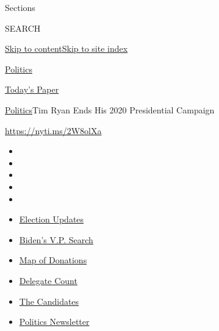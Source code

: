 Sections

SEARCH

\protect\hyperlink{site-content}{Skip to
content}\protect\hyperlink{site-index}{Skip to site index}

\href{https://www.nytimes.com/section/politics}{Politics}

\href{https://myaccount.nytimes.com/auth/login?response_type=cookie\&client_id=vi}{}

\href{https://www.nytimes.com/section/todayspaper}{Today's Paper}

\href{/section/politics}{Politics}\textbar{}Tim Ryan Ends His 2020
Presidential Campaign

\url{https://nyti.ms/2W8olXa}

\begin{itemize}
\item
\item
\item
\item
\item
\end{itemize}

\begin{itemize}
\item
  \href{https://www.nytimes.com/2020/07/31/us/elections/biden-vs-trump.html?action=click\&pgtype=Article\&state=default\&region=TOP_BANNER\&context=storylines_menu}{Election
  Updates}
\item
  \href{https://www.nytimes.com/article/biden-vice-president-2020.html?action=click\&pgtype=Article\&state=default\&region=TOP_BANNER\&context=storylines_menu}{Biden's
  V.P. Search}
\item
  \href{https://www.nytimes.com/interactive/2020/07/24/us/politics/trump-biden-campaign-donors.html?action=click\&pgtype=Article\&state=default\&region=TOP_BANNER\&context=storylines_menu}{Map
  of Donations}
\item
  \href{https://www.nytimes.com/interactive/2020/us/elections/delegate-count-primary-results.html?action=click\&pgtype=Article\&state=default\&region=TOP_BANNER\&context=storylines_menu}{Delegate
  Count}
\item
  \href{https://www.nytimes.com/interactive/2019/us/politics/2020-presidential-candidates.html?action=click\&pgtype=Article\&state=default\&region=TOP_BANNER\&context=storylines_menu}{The
  Candidates}
\item
  \href{https://www.nytimes.com/newsletters/politics?action=click\&pgtype=Article\&state=default\&region=TOP_BANNER\&context=storylines_menu}{Politics
  Newsletter}
\end{itemize}

